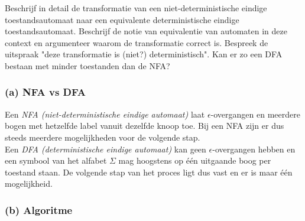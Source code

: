 \begin{question}
Beschrijf in detail de transformatie van een niet-deterministische eindige toestandsautomaat naar een equivalente deterministische eindige toestandsautomaat. Beschrijf de notie van equivalentie van automaten in deze context en argumenteer waarom de transformatie correct is. Bespreek de uitspraak "deze transformatie is (niet?) deterministisch". Kan er zo een DFA bestaan met minder toestanden dan de NFA?
\end{question}

\subsubsection*{(a) NFA vs DFA}

Een \emph{NFA (niet-deterministische eindige automaat)} laat $\epsilon$-overgangen en meerdere bogen met hetzelfde label vanuit dezelfde knoop toe. Bij een NFA zijn er dus steeds meerdere mogelijkheden voor de volgende stap.  \\
Een \emph{DFA (deterministische eindige automaat)} kan geen $\epsilon$-overgangen hebben en een symbool van het alfabet $\Sigma$ mag hoogstens op \'e\'en  uitgaande boog per toestand staan. De volgende stap van het proces ligt dus vast en er is maar \'e\'en mogelijkheid.

\subsubsection*{(b) Algoritme}

